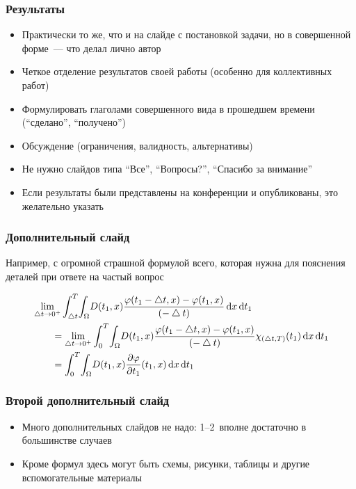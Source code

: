 \documentclass
  [ russian
  , aspectratio=1610 %
  ] {beamer}
\begin{document}
\begin{frame}
    \frametitle{Результаты}
    \begin{itemize}
        \item Практически то же, что и на слайде с постановкой задачи, но в совершенной форме~--- что делал лично автор
        \item Четкое отделение результатов своей работы (особенно для коллективных работ)
        \item Формулировать глаголами совершенного вида в прошедшем времени (\enquote{сделано}, \enquote{получено})
        \item Обсуждение (ограничения, валидность, альтернативы)
        \item Не нужно слайдов типа \enquote{Все}, \enquote{Вопросы?}, \enquote{Спасибо за внимание}
    \end{itemize}

    \begin{itemize}
        \item Если результаты были представлены на конференции и опубликованы, это желательно указать
    \end{itemize}
\end{frame}

\appendix

\begin{frame}
    \frametitle{Дополнительный слайд}
    Например, с огромной страшной формулой всего, которая нужна для пояснения деталей при ответе на частый вопрос

    \begin{align*}
        \MoveEqLeft \lim_{\bigtriangleup t \to 0^+}\int_{\bigtriangleup t}^{T} \! \int_{\Omega} \! D(t_1,x) \frac{\varphi(t_1-\bigtriangleup t,x)-\varphi(t_1,x)}{(-\bigtriangleup t)} \, \mathrm{d}x \, \mathrm{d}t_1 \\
        &= \lim_{\bigtriangleup t \to 0^+} \int_{0}^{T} \! \int_{\Omega} \! D(t_1,x) \frac{\varphi(t_1-\bigtriangleup t,x)-\varphi(t_1,x)}{(-\bigtriangleup t)} \chi_{(\bigtriangleup t,T)}(t_1) \, \mathrm{d}x \, \mathrm{d}t_1 \\
        &=\int_{0}^{T} \! \int_{\Omega} \! D(t_1,x) \frac{\partial \varphi}{\partial t_1} (t_1,x) \, \mathrm{d}x \, \mathrm{d}t_1
    \end{align*}
\end{frame}

\begin{frame}
    \frametitle{Второй дополнительный слайд}
    \begin{itemize}
        \item Много дополнительных слайдов не надо: 1--2~вполне достаточно в большинстве случаев
        \item Кроме формул здесь могут быть схемы, рисунки, таблицы и другие вспомогательные материалы
    \end{itemize}

\end{frame}
\end{document}
